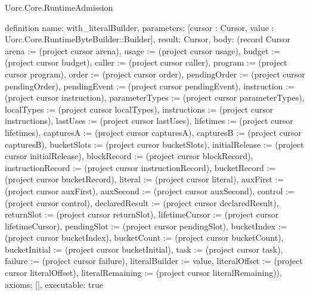 \begin{lexlean}{Uorc.Core.RuntimeAdmission}
\begin{semanticmodule}
definition{
  name: with_literalBuilder,
  parameters: [cursor : Cursor, value : Uorc.Core.RuntimeByteBuilder::Builder],
  result: Cursor,
  body: (record Cursor {arena := (project cursor arena), usage := (project cursor usage), budget := (project cursor budget), caller := (project cursor caller), program := (project cursor program), order := (project cursor order), pendingOrder := (project cursor pendingOrder), pendingEvent := (project cursor pendingEvent), instruction := (project cursor instruction), parameterTypes := (project cursor parameterTypes), localTypes := (project cursor localTypes), instructions := (project cursor instructions), lastUses := (project cursor lastUses), lifetimes := (project cursor lifetimes), capturesA := (project cursor capturesA), capturesB := (project cursor capturesB), bucketSlots := (project cursor bucketSlots), initialRelease := (project cursor initialRelease), blockRecord := (project cursor blockRecord), instructionRecord := (project cursor instructionRecord), bucketRecord := (project cursor bucketRecord), literal := (project cursor literal), auxFirst := (project cursor auxFirst), auxSecond := (project cursor auxSecond), control := (project cursor control), declaredResult := (project cursor declaredResult), returnSlot := (project cursor returnSlot), lifetimeCursor := (project cursor lifetimeCursor), pendingSlot := (project cursor pendingSlot), bucketIndex := (project cursor bucketIndex), bucketCount := (project cursor bucketCount), bucketInitial := (project cursor bucketInitial), task := (project cursor task), failure := (project cursor failure), literalBuilder := value, literalOffset := (project cursor literalOffset), literalRemaining := (project cursor literalRemaining)}),
  axioms: [],
  executable: true
}


\end{semanticmodule}
\end{lexlean}
